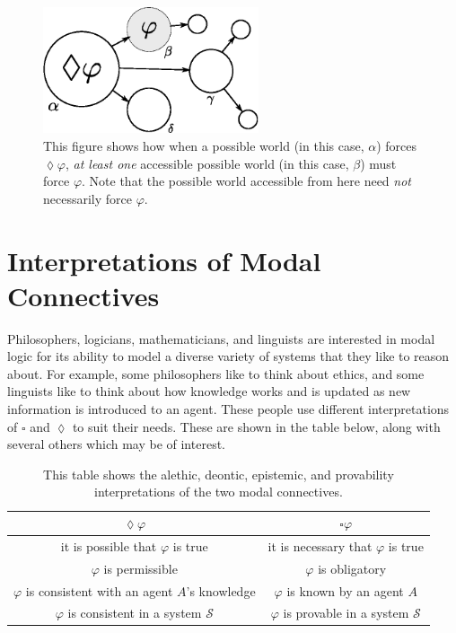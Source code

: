 \documentclass[12pt]{article}
\renewcommand{\phi}{\varphi}
\begin{document}
\begin{figure}[h]
    \centering
    \includegraphics[width=2.5in]{diamond.eps}
    \caption{This figure shows how when a possible world (in this case, $\alpha$) forces $\lozenge \phi$, \emph{at least one} accessible
    possible world (in this case, $\beta$) must force $\phi$. Note that the possible world accessible from here need \emph{not}
    necessarily force $\phi$.}
    \label{Diamond Picture}
\end{figure}

\section{Interpretations of Modal Connectives}
Philosophers, logicians, mathematicians, and linguists are interested in modal logic for its ability to model a diverse
variety of systems that they like to reason about. For example, some philosophers like to think about ethics, and some linguists like to
think about how knowledge works and is updated as new information is introduced to an agent. These people use different interpretations of
$\square$ and $\lozenge$ to suit their needs. These are shown in the table below, along with several others which may be of interest.

\begin{table}[h]
    \centering
    \begin{tabular}{| c | c |}
        \hline
        $\lozenge \phi$ & $\square \phi$ \\
        \hline
        it is possible that $\phi$ is true & it is necessary that $\phi$ is true \\
        \hline
        $\phi$ is permissible & $\phi$ is obligatory \\
        \hline
        $\phi$ is consistent with an agent $A$'s knowledge & $\phi$ is known by an agent $A$ \\
        \hline
        $\phi$ is consistent in a system $\mathcal{S}$  & $\phi$ is provable in a system $\mathcal{S}$ \\
        \hline
    \end{tabular}
    \caption{This table shows the alethic, deontic, epistemic, and provability interpretations of the two modal connectives.}
    \label{Interpretations}
\end{table}
\end{document}
